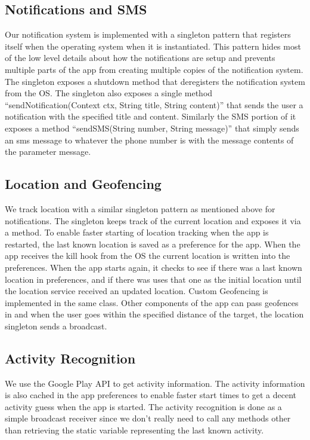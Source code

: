 \subsection{Notifications and SMS}
Our notification system is implemented with a singleton pattern that registers itself when the operating system when it is instantiated. This pattern hides most of the low level details about how the notifications are setup and prevents multiple parts of the app from creating multiple copies of the notification system. The singleton exposes a shutdown method that deregisters the notification system from the OS. The singleton also exposes a single method “sendNotification(Context ctx, String title, String content)” that sends the user a notification with the specified title and content. Similarly the SMS portion of it exposes a method “sendSMS(String number, String message)” that simply sends an sms message to whatever the phone number is with the message contents of the parameter message.

\subsection{Location and Geofencing}
We track location with a similar singleton pattern as mentioned above for notifications. The singleton keeps track of the current location and exposes it via a method. To enable faster starting of location tracking when the app is restarted, the last known location is saved as a preference for the app. When the app receives the kill hook from the OS the current location is written into the preferences. When the app starts again, it checks to see if there was a last known location in preferences, and if there was uses that one as the initial location until the location service received an updated location. Custom Geofencing is implemented in the same class. Other components of the app can pass geofences in and when the user goes within the specified distance of the target, the location singleton sends a broadcast.

\subsection{Activity Recognition}
We use the Google Play API to get activity information. The activity information is also cached in the app preferences to enable faster start times to get a decent activity guess when the app is started. The activity recognition is done as a simple broadcast receiver since we don't really need to call any methods other than retrieving the static variable representing the last known activity.

